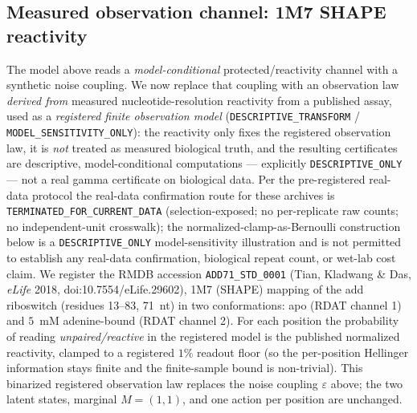 \documentclass[11pt]{article}
\begin{document}
\subsection{Measured observation channel: 1M7 SHAPE reactivity}\label{sec:real-measured}
The model above reads a \emph{model-conditional} protected/reactivity channel with a synthetic noise
coupling. We now replace that coupling with an observation law \emph{derived from} measured
nucleotide-resolution reactivity from a published assay, used as a \emph{registered finite observation
model} (\texttt{DESCRIPTIVE\_TRANSFORM} / \texttt{MODEL\_SENSITIVITY\_ONLY}): the reactivity only fixes
the registered observation law, it is \emph{not} treated as measured biological truth, and the resulting
certificates are descriptive, model-conditional computations --- explicitly \texttt{DESCRIPTIVE\_ONLY}
--- not a real gamma certificate on biological data. Per the pre-registered real-data protocol the
real-data confirmation route for these archives is \texttt{TERMINATED\_FOR\_CURRENT\_DATA}
(selection-exposed; no per-replicate raw counts; no independent-unit crosswalk); the
normalized-clamp-as-Bernoulli construction below is a \texttt{DESCRIPTIVE\_ONLY} model-sensitivity
illustration and is not permitted to establish any real-data confirmation, biological repeat count, or
wet-lab cost claim. We register the RMDB accession
\texttt{ADD71\_STD\_0001} (Tian, Kladwang \& Das, \emph{eLife} 2018, doi:10.7554/eLife.29602), 1M7
(SHAPE) mapping of the add riboswitch (residues 13--83, 71~nt) in two conformations: apo (RDAT channel 1)
and $5$~mM adenine-bound (RDAT channel 2). For each position the probability of reading
\emph{unpaired/reactive} in the registered model is the published normalized reactivity, clamped to a
registered $1\%$ readout floor (so the per-position Hellinger information stays finite and the
finite-sample bound is non-trivial). This binarized registered observation law replaces the noise
coupling $\varepsilon$ above; the two latent states, marginal $M=(1,1)$, and one action per position are
unchanged.
\end{document}
